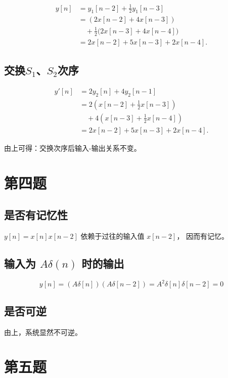 \documentclass[UTF8, fontset=fandol,12pt, a4paper]{ctexart}
\begin{document}
\begin{align}
  y[n] &= y_1[n-2] + \frac{1}{2} y_1[n-3] \\
       &= (2x[n-2] + 4x[n-3]) \\
       &\quad + \frac{1}{2}\bigl(2x[n-3] + 4x[n-4]\bigr) \\
       &= 2x[n-2] + 5x[n-3] + 2x[n-4].
\end{align}

\subsection {交换$S_1$、$S_2$次序}

\begin{align}
  y'[n] &= 2y_2[n] + 4y_2[n-1] \\
        &= 2(x[n-2] + \frac{1}{2}x[n-3]) \\
        &\quad + 4(x[n-3] + \frac{1}{2}x[n-4]) \\
        &= 2x[n-2] + 5x[n-3] + 2x[n-4].
\end{align}

由上可得：交换次序后输入-输出关系不变。

\section* {第四题}

\subsection{是否有记忆性}

$y[n] = x[n]x[n-2]$ 依赖于过往的输入值 $x[n-2]$， 因而有记忆。

\subsection{输入为 $A\delta (n)$ 时的输出}

$$y[n] = (A\delta [n])(A\delta [n-2]) = A^2 \delta[n]\delta[n-2] = 0$$

\subsection{是否可逆}

由上，系统显然不可逆。

\section* {第五题}
\end{document}
